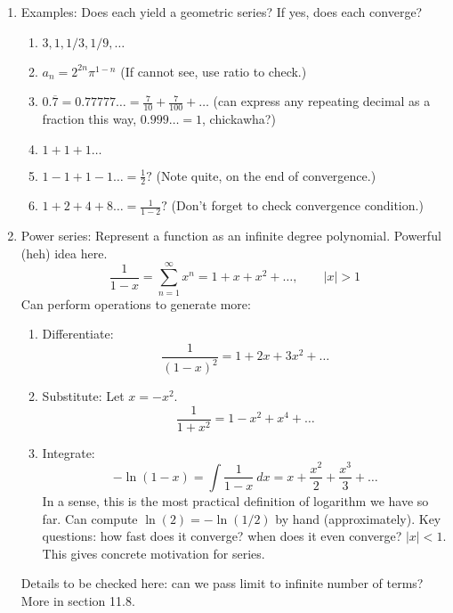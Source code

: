 \documentclass{article}
\begin{document}
\begin{enumerate}
\begin{enumerate}
\item Examples: Does each yield a geometric series? If yes, does each converge?
\begin{enumerate}
\item $3, 1, 1/3, 1/9, \dots$
\item $a_n=2^{2n}\pi^{1-n}$ (If cannot see, use ratio to check.)
\item $0.\overline{7} = 0.77777\dots = \frac{7}{10}+\frac{7}{100}+\dots$ (can express any repeating decimal as a fraction this way, $0.999\dots = 1$, chickawha?)
\item $1+1+1\dots$
\item $1-1+1-1\dots=\frac{1}{2}?$ (Note quite, on the end of convergence.)
\item $1+2+4+8\dots=\frac{1}{1-2}?$ (Don't forget to check convergence condition.)
\end{enumerate}

\item Power series: Represent a function as an infinite degree polynomial. Powerful (heh) idea here.
$$
\frac{1}{1-x} = \sum_{n=1}^\infty x^n = 1 + x + x^2 + \dots, \quad\quad |x|>1
$$
Can perform operations to generate more:
\begin{enumerate}
\item Differentiate: 
\[
\frac{1}{(1-x)^2} = 1 + 2x + 3x^2 + \dots
\]
\item Substitute: Let $x=-x^2$.
\[
\frac{1}{1+x^2} = 1 - x^2 + x^4 + \dots
\]
\item Integrate:
\[
-\ln(1-x) = \int \frac{1}{1-x} ~dx = x + \frac{x^2}{2} + \frac{x^3}{3} + \dots
\]
In a sense, this is the most practical definition of logarithm we have so far. Can compute $\ln(2) = -\ln(1/2)$ by hand (approximately). Key questions: how fast does it converge? when does it even converge? $|x|<1$. This gives concrete motivation for series.
\end{enumerate}
Details to be checked here: can we pass limit to infinite number of terms? More in section 11.8.
\end{enumerate}


\end{enumerate}
\end{document}
